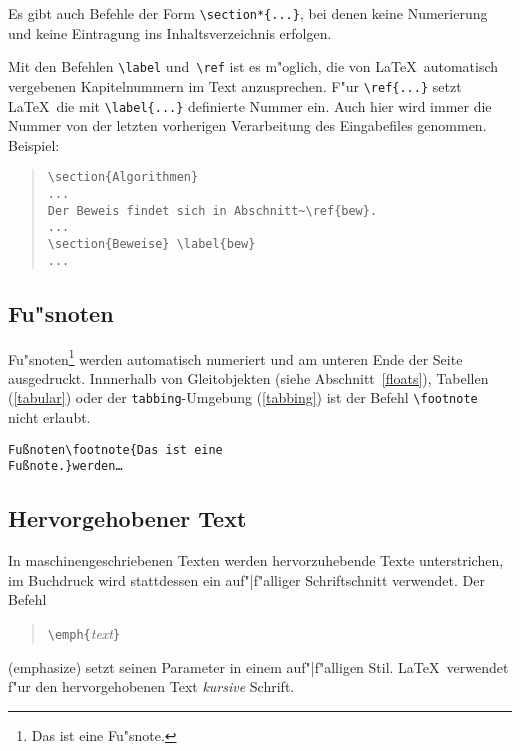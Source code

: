 Es gibt auch Befehle der Form \verb|\section*{...}|, bei denen
keine Numerierung und keine Eintragung ins Inhaltsverzeichnis
erfolgen.

Mit den Befehlen \verb|\label| und~\verb|\ref| ist es m"oglich,
die von \LaTeX\ automatisch vergebenen Kapitelnummern im Text
anzusprechen.
F"ur \verb|\ref{...}| setzt \LaTeX\ die
mit \verb|\label{...}| definierte Nummer ein.
Auch hier wird immer die Nummer von der letzten vorherigen
Verarbeitung des Eingabefiles genommen.
Beispiel:
\begin{quote}
\begin{verbatim}
\section{Algorithmen}
...
Der Beweis findet sich in Abschnitt~\ref{bew}.
...
\section{Beweise} \label{bew}
...
\end{verbatim}
\end{quote}
 
 
\subsection{Fu"snoten}
 
Fu"snoten\footnote{Das 
ist eine Fu"snote.} werden automatisch numeriert
und am unteren Ende der Seite ausgedruckt.  
Innnerhalb von Gleitobjekten (siehe Abschnitt~\ref{floats}), 
Tabellen (\ref{tabular}) oder der \texttt{tabbing}-Umgebung (\ref{tabbing})
ist der Befehl \verb|\footnote| nicht erlaubt.
\exa
~
\exb
\begin{alltt}
Fu\ss{}noten\verb+\footnote{Das ist eine+
Fu\ss{}note.\verb+}+ werden \dots
\end{alltt}
\exc
 
 
 
\subsection{Hervorgehobener Text}
 
In maschinengeschriebenen Texten werden hervorzuhebende Texte
unterstrichen, im Buchdruck wird stattdessen ein auf"|f"alliger
Schriftschnitt verwendet.
Der Befehl 
\begin{quote}
\verb|\emph{|\textit{text}\verb|}| 
\end{quote}
(emphasize) setzt seinen Parameter in einem auf"|f"alligen Stil.
\LaTeX\ verwendet f"ur den hervorgehobenen Text \textit{kursive}
Schrift.

